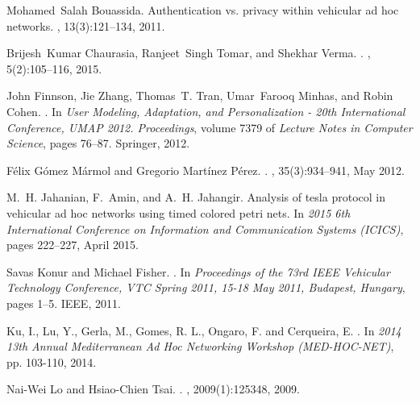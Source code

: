 \documentclass[compsoc, conference, letterpaper, 10pt, times]{IEEEtran}
\begin{document}
\begin{thebibliography}{10}
Mohamed~Salah Bouassida.
\newblock Authentication vs. privacy within vehicular ad hoc networks.
, 13(3):121--134,
  2011.

Brijesh~Kumar Chaurasia, Ranjeet~Singh Tomar, and Shekhar Verma.
.
, 5(2):105--116, 2015.

John Finnson, Jie Zhang, Thomas~T. Tran, Umar~Farooq Minhas, and Robin Cohen.
.
\newblock In {\em {User Modeling, Adaptation, and Personalization - 20th
  International Conference, {UMAP} 2012.
  Proceedings}}, volume 7379 of {\em {Lecture Notes in Computer Science}},
  pages 76--87. Springer, 2012.

F{\'e}lix {G{\'o}mez M{\'a}rmol} and Gregorio {Mart{\'i}nez P{\'e}rez}.
.
, 35(3):934--941, May 2012.

M.~H. Jahanian, F.~Amin, and A.~H. Jahangir.
\newblock Analysis of tesla protocol in vehicular ad hoc networks using timed
  colored petri nets.
\newblock In {\em 2015 6th International Conference on Information and
  Communication Systems (ICICS)}, pages 222--227, April 2015.

Savas Konur and Michael Fisher.
.
\newblock In {\em {Proceedings of the 73rd {IEEE} Vehicular Technology
  Conference, {VTC} Spring 2011, 15-18 May 2011, Budapest, Hungary}}, pages
  1--5. {IEEE}, 2011.
  
  
  
Ku, I., Lu, Y., Gerla, M., Gomes,  R. L., Ongaro, F. and Cerqueira, E. 
.
\newblock In \textit{2014 13th Annual Mediterranean Ad Hoc Networking Workshop (MED-HOC-NET)}, pp. 103-110,  2014.

Nai-Wei Lo and Hsiao-Chien Tsai.
.
,
  2009(1):125348, 2009.


\end{thebibliography}
\end{document}
